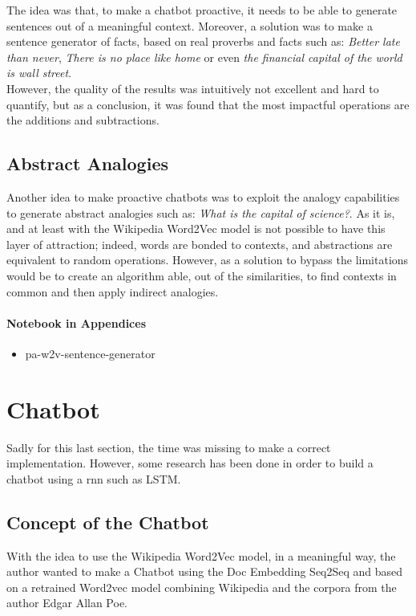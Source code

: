 The idea was that, to make a chatbot proactive, it needs to be able to generate sentences out of a meaningful context. Moreover, a solution was to make a sentence generator of facts, based on real proverbs and facts such as: \textit{Better late than never}, \textit{ There is no place like home} or even \textit{the financial capital of the world is wall street}.\\

However, the quality of the results was intuitively not excellent and hard to quantify, but as a conclusion, it was found that the most impactful operations are the additions and subtractions.

\subsection{Abstract Analogies}
\label{experiment:abstract-analogies}
Another idea to make proactive chatbots was to exploit the analogy capabilities to generate abstract analogies such as: \textit{What is the capital of science?}. As it is, and at least with the Wikipedia Word2Vec model is not possible to have this layer of attraction; indeed, words are bonded to contexts, and abstractions are equivalent to random operations. However, as a solution to bypass the limitations would be to create an algorithm able, out of the similarities, to find contexts in common and then apply indirect analogies.

\paragraph{Notebook in Appendices}
\begin{itemize}
    \setlength\itemsep{0em}
    \item pa-w2v-sentence-generator
\end{itemize}



\section{Chatbot}
Sadly for this last section, the time was missing to make a correct implementation. However, some research has been done in order to build a chatbot using a \gls{rnn} such as LSTM.

\subsection{Concept of the Chatbot}
With the idea to use the Wikipedia Word2Vec model, in a meaningful way, the author wanted to make a Chatbot using the Doc Embedding Seq2Seq and based on a retrained Word2vec model combining Wikipedia and the corpora from the author Edgar Allan Poe.

